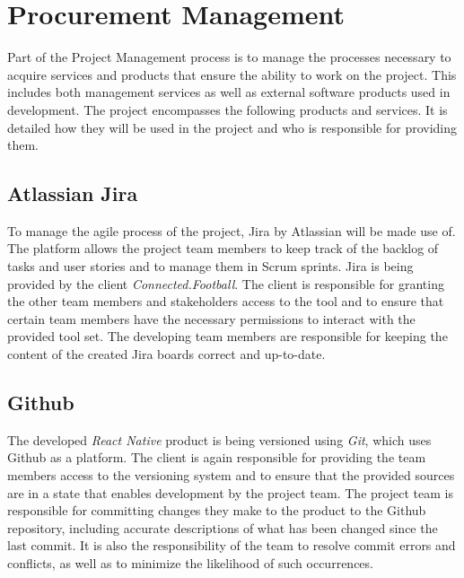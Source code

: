 \section{Procurement Management}
\label{sec:procurement}

Part of the Project Management process is to manage the processes necessary to acquire services and products that ensure the ability to work on the project. This includes both management services as well as external software products used in development.
\newline
The project encompasses the following products and services. It is detailed how they will be used in the project and who is responsible for providing them.

\subsection{Atlassian Jira}

To manage the agile process of the project, Jira by Atlassian will be made use of. The platform allows the project team members to keep track of the backlog of tasks and user stories and to manage them in Scrum sprints.
\newline
Jira is being provided by the client \textit{Connected.Football}. The client is responsible for granting the other team members and stakeholders access to the tool and to ensure that certain team members have the necessary permissions to interact with the provided tool set. The developing team members are responsible for keeping the content of the created Jira boards correct and up-to-date.

\subsection{Github}

The developed \textit{React Native} product is being versioned using \textit{Git}, which uses Github as a platform. The client is again responsible for providing the team members access to the versioning system and to ensure that the provided sources are in a state that enables development by the project team.
\newline
The project team is responsible for committing changes they make to the product to the Github repository, including accurate descriptions of what has been changed since the last commit. It is also the responsibility of the team to resolve commit errors and conflicts, as well as to minimize the likelihood of such occurrences.

